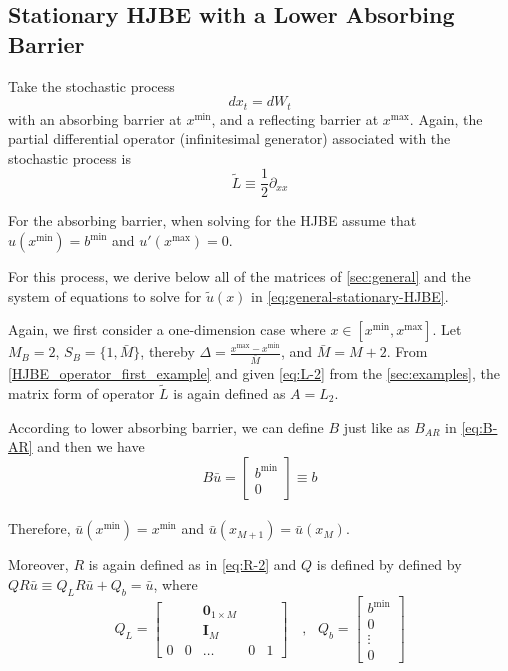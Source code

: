 \documentclass[11pt]{article}
\newcommand{\D}[1][]{\ensuremath{\partial_{#1}}}
\begin{document}
\subsection{Stationary HJBE with a Lower Absorbing Barrier}
Take the stochastic process
$$
d x_t = d W_t
$$
with an absorbing barrier at $x^{\min}$, and a reflecting barrier at $x^{\max}$. Again, the partial differential operator (infinitesimal generator) associated with the stochastic process is
$$
\tilde{L} \equiv \frac{1}{2}\D[xx]
$$

For the absorbing barrier, when solving for the HJBE assume that $u(x^{\min}) = b^{\min}$ and $u'(x^{\max}) = 0$.

For this process, we derive below all of the matrices of \cref{sec:general} and the system of equations to solve for $\tilde{u}(x)$ in \cref{eq:general-stationary-HJBE}.

Again, we first consider a one-dimension case where $x\in [x^{\min},x^{\max}]$. Let $M_B = 2$, $S_B = \{1,\bar{M}\}$, thereby $\Delta  = \frac{x^{\max}-x^{\min}}{\bar{M}}$, and $\bar{M} = M+2$. From \eqref{HJBE_operator_first_example} and given \eqref{eq:L-2} from the \cref{sec:examples}, the matrix form of operator $\tilde{L}$ is again defined as $A = L_2$.

According to lower absorbing barrier, we can define $B$ just like as $B_{AR}$ in \eqref{eq:B-AR} and then we have
\begin{equation}
B\bar{u} = \begin{bmatrix}
b^{\min}\\
0
\end{bmatrix} \equiv b
\end{equation}\\
Therefore, $\bar{u}(x^{\min}) = x^{\min}$ and $\bar{u}(x_{M+1}) = \bar{u}(x_M)$.

Moreover, $R$ is again defined as in \eqref{eq:R-2} and $Q$ is defined by defined by $Q R\bar{u}\equiv Q_L R\bar{u}+Q_b = \bar{u}$, where
\begin{equation}
Q_L = \begin{bmatrix}
& & \mathbf{0}_{1\times M} & & \\
& & \mathbf{I}_M & & \\
0&0&\dots&0&1
\end{bmatrix}%
\quad, \text{ } Q_b = \begin{bmatrix}
b^{\min}\\
0\\
\vdots\\
0
\end{bmatrix}%
\end{equation}
\end{document}
